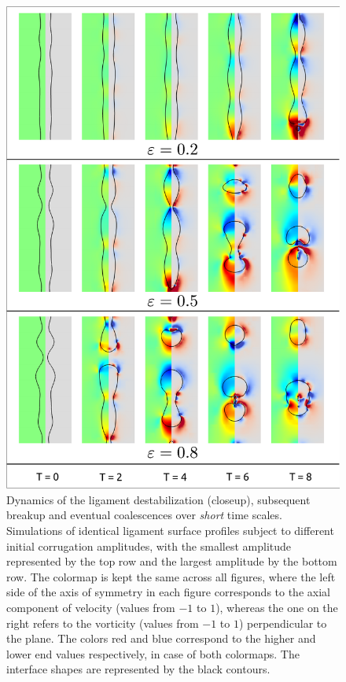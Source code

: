 \begin{figure}
\centering
\includegraphics{plots/ligament_breakup/amplitude_compare.pdf}
	\caption{Dynamics of the ligament destabilization (closeup), subsequent breakup 
	and eventual coalescences over \textit{short} time scales.
	Simulations of identical ligament surface profiles
	subject to different initial corrugation amplitudes, with the smallest 
	amplitude represented by the top row and the largest amplitude by the bottom row. 
	The colormap is kept the same across all figures, where the left 
	side of the axis of symmetry in each figure corresponds to the axial component of 
	velocity (values from $-1$ to $1$), whereas the one on the right refers to 
	the vorticity (values from $-1$ to $1$) perpendicular to the plane. 
	The colors red and blue correspond to the higher and lower 
	end values respectively, in case of both colormaps. 
	The interface shapes are represented by the black contours.
	}
\label{amp_comp}
\end{figure}


